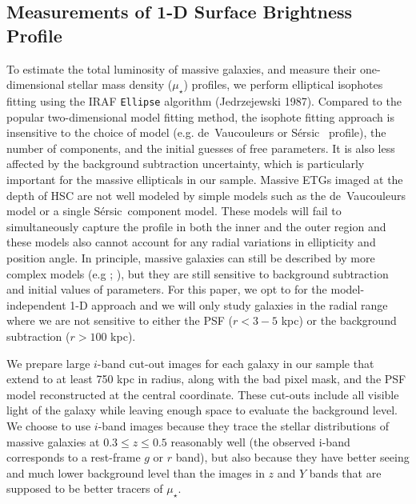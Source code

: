 \documentclass{emulateapj}
\def\ser{{S\'{e}rsic\ }}
\def\mden{{$\mu_{\star}$}}
\begin{document}
\begin{CJK*}{UTF8}{gbsn}
\section{Measurements of 1-D Surface Brightness Profile}
    \label{sec:ellipse}
    
    To estimate the total luminosity of massive galaxies, and measure their 
    one-dimensional stellar mass density (\mden{}) profiles, we perform elliptical 
    isophotes fitting using the IRAF \texttt{Ellipse} algorithm (Jedrzejewski 1987).  
    Compared to the popular two-dimensional model fitting method, the isophote fitting
    approach is insensitive to the choice of model (e.g. de~Vaucouleurs or \ser{} 
    profile), the number of components, and the initial guesses of free parameters. 
    It is also less affected by the background subtraction uncertainty, which is 
    particularly important for the massive ellipticals in our sample.
    Massive ETGs imaged at the depth of HSC are not well modeled by simple models such 
    as the de~Vaucouleurs model or a single \ser component model. 
    These models will fail to simultaneously capture the profile in both the inner and 
    the outer region and these models also cannot account for any radial variations in 
    ellipticity and position angle. 
    In principle, massive galaxies can still be described by more complex 
    models (e.g \citealt{Huang2013a}; \citealt{Huang2013b}), but they are still 
    sensitive to background subtraction and initial values of parameters. 
    For this paper, we opt to for the model-independent 1-D approach and we will only 
    study galaxies in the radial range where we are not sensitive to either the PSF 
    ($r<3-5$ kpc) or the background subtraction ($r>100$ kpc). 
        
    We prepare large $i$-band cut-out images for each galaxy in our sample that extend 
    to at least 750 kpc in radius, along with the bad pixel mask, and the PSF model 
    reconstructed at the central coordinate. 
    These cut-outs include all visible light of the galaxy while leaving enough space 
    to evaluate the background level. 
    We choose to use $i$-band images because they trace the stellar distributions of 
    massive galaxies at $0.3 \leq z \leq 0.5$ reasonably well 
    (the observed i-band corresponds to a rest-frame $g$ or $r$ band), but also because 
    they have better seeing and much lower background level than the images 
    in $z$ and $Y$ bands that are supposed to be better tracers of \mden{}. 
    

\end{CJK*}
\end{document}
